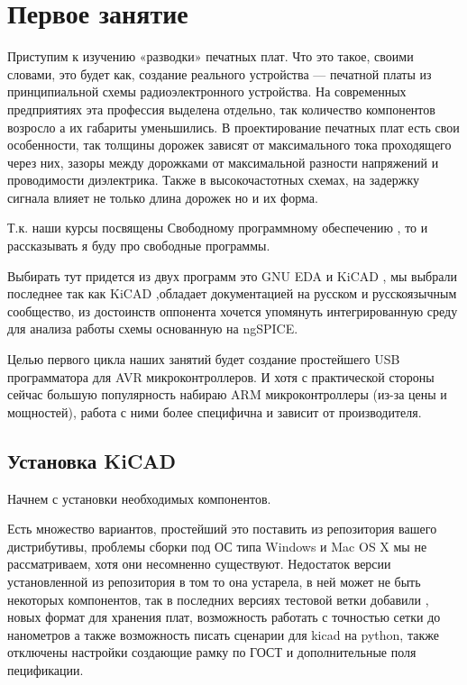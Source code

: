 \section{Первое занятие} 


Приступим к изучению «разводки» печатных плат. Что это такое, своими словами, это будет как, создание реального устройства — печатной платы из принципиальной схемы радиоэлектронного устройства.  На современных предприятиях эта профессия выделена отдельно, так количество компонентов возросло а  их габариты уменьшились. В проектирование печатных плат есть свои особенности, так толщины дорожек зависят от максимального тока проходящего через них, зазоры между дорожками от максимальной разности напряжений и проводимости диэлектрика. Также в высокочастотных схемах, на задержку сигнала влияет не только длина дорожек но и их форма.

Т.к. наши курсы посвящены Свободному программному обеспечению ,  то и рассказывать я буду  про свободные программы.

Выбирать тут придется из двух программ это GNU EDA и KiCAD , мы выбрали последнее так как KiCAD ,обладает документацией на русском и русскоязычным  сообщество, из достоинств оппонента хочется упомянуть интегрированную среду для анализа работы схемы основанную на  ngSPICE. 

Целью первого цикла наших занятий будет создание простейшего  USB программатора для AVR микроконтроллеров. И хотя с практической стороны сейчас большую популярность набираю ARM микроконтроллеры (из-за цены и мощностей), работа с ними более специфична и зависит от производителя.

\subsection{Установка KiCAD} 

Начнем с установки необходимых компонентов.

Есть множество вариантов, простейший это поставить из репозитория вашего дистрибутивы, проблемы сборки под ОС типа Windows и Mac OS X  мы не рассматриваем, хотя они несомненно существуют. Недостаток версии установленной из  репозитория в том то она устарела, в ней может не быть некоторых компонентов, так в последних версиях тестовой ветки добавили , новых формат для хранения плат, возможность работать с точностью сетки до нанометров а также возможность писать сценарии для kicad на python, также отключены настройки создающие рамку по ГОСТ и дополнительные поля пецификации.

